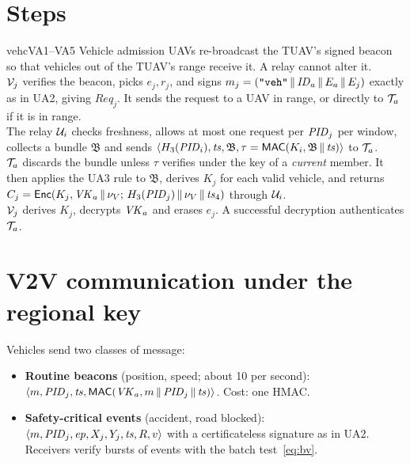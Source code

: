 \section{Steps}
\begin{stepbox}{vehc}{VA1--VA5 \;Vehicle admission}
 UAVs re-broadcast the TUAV's signed beacon so that vehicles out of the TUAV's range receive it. A relay cannot alter it.\\[2pt]
 $\mathcal{V}_j$ verifies the beacon, picks $e_j,r_j$, and signs $m_j=(\texttt{"veh"}\,\|\,\mathit{ID}_a\,\|\, E_a\,\|\, E_j)$ exactly as in UA2, giving
$\mathit{Req}_j$. It sends the request to a UAV in range, or directly to $\mathcal{T}_a$ if it is in range.\\[2pt]
 The relay $\mathcal{U}_i$ checks freshness, allows at most one request per $\mathit{PID}_j$ per window, collects a bundle $\mathfrak{B}$ and sends
$\langle H_3(\mathit{PID}_i),\mathit{ts},\mathfrak{B},\tau=\mathsf{MAC}(K_i,\mathfrak{B}\,\|\,\mathit{ts})\rangle$ to $\mathcal{T}_a$.\\[2pt]
 $\mathcal{T}_a$ discards the bundle unless $\tau$ verifies under the key of a \emph{current} member. It then applies the UA3 rule to
$\mathfrak{B}$, derives $K_j$ for each valid vehicle, and returns $C_j=\mathsf{Enc}(K_j,\mathit{VK}_a\,\|\,\nu_V;\,H_3(\mathit{PID}_j)\,\|\,\nu_V\,\|\,\mathit{ts}_4)$ through $\mathcal{U}_i$.\\[2pt]
 $\mathcal{V}_j$ derives $K_j$, decrypts $\mathit{VK}_a$ and erases $e_j$. A successful decryption authenticates $\mathcal{T}_a$.
\end{stepbox}

\section{V2V communication under the regional key}
Vehicles send two classes of message:
\begin{itemize}
  \item \textbf{Routine beacons} (position, speed; about 10 per second):\ $\langle m,\mathit{PID}_j,\mathit{ts},\mathsf{MAC}(\mathit{VK}_a,m\,\|\,\mathit{PID}_j\,\|\,\mathit{ts})\rangle$. Cost: one HMAC.
  \item \textbf{Safety-critical events} (accident, road blocked): $\langle m,\mathit{PID}_j,\mathit{ep},X_j,Y_j,\mathit{ts},R,v\rangle$ with a certificateless signature as in UA2.
        Receivers verify bursts of events with the batch test~\eqref{eq:bv}.
\end{itemize}


